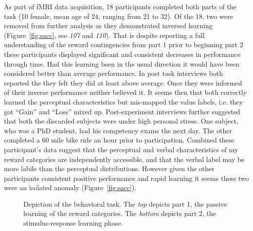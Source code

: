 \documentclass[doc,12pt]{apa}        %
\begin{document}
As part of fMRI data acquisition, 18 participants completed both parts of the task (10 female, mean age of 24, ranging from 21 to 32).  Of the 18, two were removed from further analysis as they demonstrated inversed learning (Figure~\ref{fig:sacc}, see \emph{107} and \emph{110}).  That is despite reporting a full understanding of the reward contingencies from part 1 prior to beginning part 2 these participants displayed significant and consistent decreases in performance through time.  Had this learning been in the usual direction it would have been considered better than average performance.  In post task interviews both reported the they felt they did at least above average.  Once they were informed of their inverse performance neither believed it.  It seems then that both correctly learned the perceptual characteristics but mis-mapped the value labels, i.e. they got ``Gain'' and ``Loss''  mixed up.  Post-experiment interviews further suggested that both the discarded subjects were under high personal stress.  One subject, who was a PhD student, had his competency exams the next day.  The other completed a 60 mile bike ride an hour prior to participation.  Combined these participant's data suggest that the perceptual and verbal characteristics of my reward categories are independently accessible, and that the verbal label may be more labile than the perceptual distributions.  However given the other participants consistent positive performance and rapid learning it seems these two were an isolated anomaly (Figure~\ref{fig:sacc}).

\begin{figure}[tp]
    \centering
    \caption{Depiction of the behavioral task.  The \emph{top} depicts part 1, the passive learning of the reward categories.  The \emph{bottom} depicts part 2, the stimulus-response learning phase.}
	\label{fig:task}
\end{figure}
\end{document}
